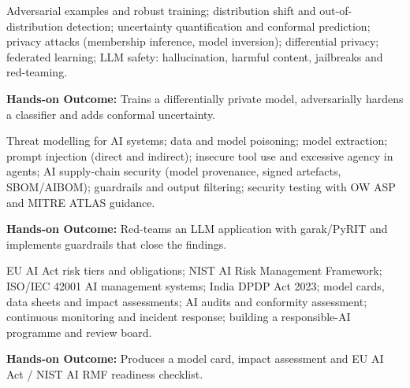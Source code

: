 \documentclass[10pt,a4paper]{article}
\begin{document}
\begin{tcolorbox}[unitbox,title={{\color{gold}UNIT III}\quad Robustness, Privacy and Safety\hfill{\color{gold}9 Hours}}]\small Adversarial examples and robust training; distribution shift and out-of-distribution detection; uncertainty quantification and conformal prediction; privacy attacks (membership inference, model inversion); differential privacy; federated learning; LLM safety: hallucination, harmful content, jailbreaks and red-teaming.\par\vspace{2pt}\par\textbf{Hands-on Outcome:} Trains a differentially private model, adversarially hardens a classifier and adds conformal uncertainty.\end{tcolorbox}
\begin{tcolorbox}[unitbox,title={{\color{gold}UNIT IV}\quad AI and LLM Security\hfill{\color{gold}9 Hours}}]\small Threat modelling for AI systems; data and model poisoning; model extraction; prompt injection (direct and indirect); insecure tool use and excessive agency in agents; AI supply-chain security (model provenance, signed artefacts, SBOM/AIBOM); guardrails and output filtering; security testing with OW ASP and MITRE ATLAS guidance.\par\vspace{2pt}\par\textbf{Hands-on Outcome:} Red-teams an LLM application with garak/PyRIT and implements guardrails that close the findings.\end{tcolorbox}
\begin{tcolorbox}[unitbox,title={{\color{gold}UNIT V}\quad Governance, Regulation and Assurance\hfill{\color{gold}9 Hours}}]\small EU AI Act risk tiers and obligations; NIST AI Risk Management Framework; ISO/IEC 42001 AI management systems; India DPDP Act 2023; model cards, data sheets and impact assessments; AI audits and conformity assessment; continuous monitoring and incident response; building a responsible-AI programme and review board.\par\vspace{2pt}\par\textbf{Hands-on Outcome:} Produces a model card, impact assessment and EU AI Act / NIST AI RMF readiness checklist.\end{tcolorbox}
\end{document}

